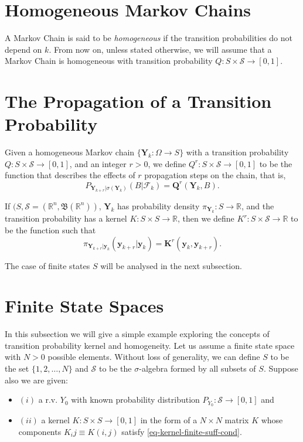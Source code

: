 \section{Homogeneous Markov Chains}

A Markov Chain is said to be {\it homogeneous} if the transition probabilities do not depend on $k$.
From now on, unless stated otherwise,
we will assume that a Markov Chain is homogeneous with transition probability $Q:S\times\mathcal{S}\rightarrow [0,1]$.

\section{The Propagation of a Transition Probability}

Given a homogeneous Markov chain $\{\mathbf{Y}_k:\Omega\rightarrow S\}$ with a transition probability $Q:S\times\mathcal{S}\rightarrow [0,1]$,
and an integer $r>0$,
we define $Q^r:S\times\mathcal{S}\rightarrow [0,1]$ to be the function that describes the effects of $r$ propagation steps on the chain, that is,
\begin{equation*}%
P_{\mathbf{Y}_{k+r}|\sigma(\mathbf{Y}_k)} (B|\mathcal{F}_k) = \mathbf{Q}^r(\mathbf{Y}_k,B).
\end{equation*}

If $(S,\mathcal{S}=(\mathbb{R}^n,\mathfrak{B}(\mathbb{R}^n))$,
$\mathbf{Y}_k$ has probability density $\pi_{\mathbf{Y}_k}:S\rightarrow\mathbb{R}$, and
the transition probability has a kernel $K:S\times S\rightarrow\mathbb{R}$,
then we define $K^r:S\times\mathcal{S}\rightarrow\mathbb{R}$ to be the function such that
\begin{equation}\label{eq-def-Qr-Rac}
\pi_{\mathbf{Y}_{k+r}|\mathbf{y}_k} (\mathbf{y}_{k+r}|\mathbf{y}_k) = \mathbf{K}^r(\mathbf{y}_k,\mathbf{y}_{k+r}).
\end{equation}

The case of finite states $S$ will be analysed in the next subsection.

\section{Finite State Spaces}

In this subsection we will give a simple example exploring the concepts of transition probability kernel and homogeneity.
Let us assume a finite state space with $N>0$ possible elements.
Without loss of generality, we can define $S$ to be the set $\{1,2,\ldots,N\}$ and $\mathcal{S}$ to be the $\sigma$-algebra formed by all subsets of $S$.
Suppose also we are given:
{\renewcommand{\labelitemi}{}
\begin{itemize}
\item $(i)$ a r.v. $Y_0$ with known probability distribution $P_{Y_0}:\mathcal{S}\rightarrow [0,1]$ and
\item $(ii)$ a kernel $K:S\times S\rightarrow [0,1]$ in the form of a $N\times N$ matrix $K$ whose components $K_ij\equiv K(i,j)$ satisfy \eqref{eq-kernel-finite-suff-cond}.
\end{itemize}
}

